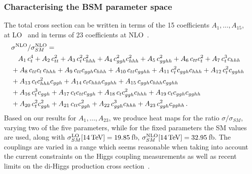\subsubsection{Characterising the BSM parameter space}

The total cross section can be written in terms of the 15 coefficients 
$A_1, \ldots, A_{15}$, at LO~\cite{Carvalho:2015ttv,Azatov:2015oxa} and in terms of 23 coefficients at NLO~\cite{Buchalla:2018yce}.
%
\begin{align}
\label{eq:Acoeffs_all}
&\sigma^{\rm{NLO}}/\sigma^{\rm{NLO}}_{SM}  =\nonumber\\
& \quad  A_1\, c_t^4 + A_2 \, c_{tt}^2  + A_3\,  c_t^2 c_{hhh}^2  + 
A_4 \, c_{ggh}^2 c_{hhh}^2  + A_5\,  c_{gghh}^2  + 
A_6\, c_{tt} c_t^2 + A_7\,  c_t^3 c_{hhh} \nonumber\\
& + A_8\,  c_{tt} c_t\, c_{hhh}  + A_9\, c_{tt} c_{ggh} c_{hhh} + A_{10}\, c_{tt} c_{gghh} + 
A_{11}\,  c_t^2 c_{ggh} c_{hhh} + A_{12}\, c_t^2 c_{gghh} \nonumber\\
& + A_{13}\, c_t c_{hhh}^2 c_{ggh}  + A_{14}\, c_t c_{hhh} c_{gghh} +
A_{15}\, c_{ggh} c_{hhh} c_{gghh} \nonumber\\ 
& + A_{16}\, c^3_t c_{ggh} + A_{17}\,  c_t c_{tt} c_{ggh} 
+ A_{18}\, c_t c_{ggh}^2 c_{hhh} + A_{19}\, c_t c_{ggh} c_{gghh} 
\nonumber\\
&+ A_{20}\,  c_t^2 c_{ggh}^2 + A_{21}\, c_{tt} c_{ggh}^2 
+ A_{22}\, c_{ggh}^3 c_{hhh} + A_{23}\, c_{ggh}^2 c_{gghh}\,.
\end{align}
Based on our results for $A_1,\ldots, A_{23}$, we produce heat maps for the ratio $\sigma/\sigma_{SM}$, 
varying two of the five parameters, while for the fixed parameters the SM values are used, along with
$\sigma_{SM}^{\rm{LO}}[14\,\mathrm{TeV}]=19.85$\,fb,
$\sigma_{SM}^{\rm{NLO}}[14\,\mathrm{TeV}]=32.95$\,fb.
The couplings are varied in a range which seems reasonable when taking into account the current constraints on the 
Higgs coupling measurements
as well as recent limits on the di-Higgs production cross
section~\cite{CMS-PAS-HIG-17-030,ATLAS-CONF-2018-043}.

